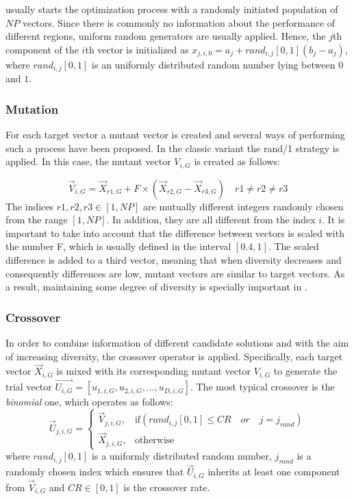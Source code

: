 \DE{} usually starts the optimization process with a randomly initiated population of $NP$ vectors.
%
Since there is commonly no information about the performance of different regions, uniform random generators are usually applied.
%
Hence, the $j$th component of the $i$th vector is initialized as $x_{j,i,0} = a_{j} + rand_{i,j}[0,1] (b_{j} - a_{j})$,
where $rand_{i,j}[0,1]$ is an uniformly distributed random number lying between $0$ and $1$.

\subsubsection{Mutation}

For each target vector a mutant vector is created and several ways of performing
such a process have been proposed.
%
In the classic \DE{} variant the rand/1 strategy is applied.
%
In this case, the mutant vector $V_{i,G}$ is created as follows:

\begin{equation}\label{eqn:mutation}
\vec{V}_{i,G} = \vec{X}_{r1, G} + F \times (\vec{X}_{r2, G} - \vec{X}_{r3, G}) \quad r1 \neq r2 \neq r3
\end{equation}
%
The indices $r1, r2, r3 \in [1,NP]$ are mutually different integers randomly chosen from the range $[1, NP]$.
%
In addition, they are all different from the index $i$.
%
It is important to take into account that the difference between vectors is scaled with the number F, which is usually defined in the interval $[0.4, 1]$.
%
The scaled difference is added to a third vector, meaning that
when diversity decreases and consequently differences are low, mutant vectors are similar to target vectors.
%
As a result, maintaining some degree of diversity is specially important in \DE{}.

\subsubsection{Crossover}

In order to combine information of different candidate solutions and with the aim of increasing diversity, the crossover
operator is applied.
%
Specifically, each target vector $\vec{X}_{i,G}$ is mixed with its corresponding mutant vector $V_{i,G}$ to 
generate the trial vector $\vec{U_{i,G}} = [u_{1,i,G},u_{2,i,G}, ..., u_{D,i,G} ]$.
%
The most typical crossover is the \textit{binomial} one, which operates as follows:
%
\begin{equation} \label{eqn:crossover}
\vec{U}_{j,i,G}= 
\begin{cases}
    \vec{V}_{j,i,G},& \text{if} (rand_{i,j}[0,1] \leq CR \quad or \quad j = j_{rand}  )\\
    \vec{X}_{j,i,G},              & \text{otherwise}
\end{cases}
\end{equation}
where $rand_{i,j}[0,1]$ is a uniformly distributed random number,
$j_{rand}$ is a randomly chosen index which ensures that $\vec{U}_{i,G}$ inherits at least one component from $\vec{V}_{i,G}$ and
$CR \in [0,1]$ is the crossover rate.



